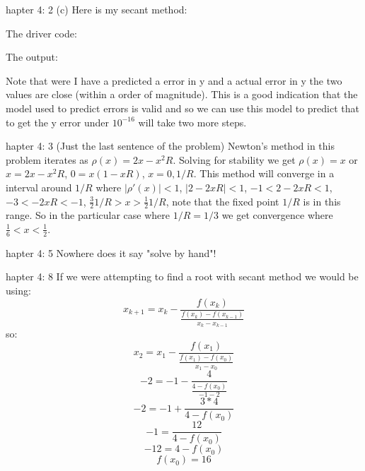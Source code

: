\documentclass[12pt]{article}
\makeatletter
\theoremstyle{homework}
\newenvironment{exercise}[1]
{\def\@currentlabel{#1}\exercisecore}
{\endexercisecore}
\makeatother
\begin{document}
\begin{exercise}

Chapter 4: 2 (c)
\end{exercise}
Here is my secant method:

The driver code:

The output:

Note that were I have a predicted a error in y and a actual error in y the two values are close (within a order of magnitude).  This is a good indication that the model used to predict errors is valid and so we can use this model to predict that to get the y error under $10^{-16}$ will take two more steps.

\begin{exercise}

Chapter 4: 3 (Just the last sentence of the problem)
\end{exercise}
Newton's method in this problem iterates as $\rho (x)=2x-x^2R$.  Solving for stability we get $\rho (x)=x$ or $x=2x-x^2R$, $0=x(1-xR)$, $x=0,1/R$.  This method will converge in a interval around $1/R$ where $|\rho'(x)|<1$, $|2-2xR|<1$, $-1<2-2xR<1$, $-3<-2xR<-1$, $\frac{3}{2}1/R>x>\frac{1}{2}1/R$, note that the fixed point $1/R$ is in this range.  So in the particular case where $1/R=1/3$ we get convergence where $\frac{1}{6}<x<\frac{1}{2}$.

\begin{exercise}

Chapter 4: 5
\end{exercise}
Nowhere does it say "solve by hand"!


\newpage
\begin{exercise}

Chapter 4: 8
\end{exercise}
If we were attempting to find a root with secant method we would be using:
$$x_{k+1}=x_k-\frac{f(x_k)}{\frac{f(x_k)-f(x_{k-1})}{x_k-x_{k-1}}}$$
so:
$$x_{2}=x_1-\frac{f(x_1)}{\frac{f(x_1)-f(x_{0})}{x_1-x_{0}}}$$
$$-2=-1-\frac{4}{\frac{4-f(x_0)}{-1-2}}$$
$$-2=-1+\frac{3*4}{4-f(x_0)}$$
$$-1=\frac{12}{4-f(x_0)}$$
$$-12=4-f(x_0)$$
$$f(x_0)=16$$
\end{document}
